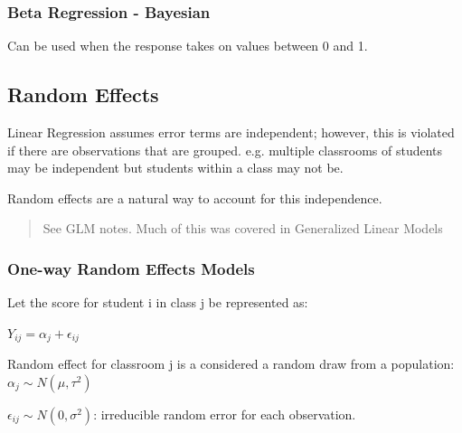 \documentclass[11pt]{article}
\begin{document}
\subsubsection{Beta Regression - Bayesian}
\label{sec:orgc52d520}

Can be used when the response takes on values between 0 and 1.


\subsection{Random Effects}
\label{sec:orga0ca169}

Linear Regression assumes error terms are independent; however, this is violated
if there are observations that are grouped. e.g. multiple classrooms of students
may be independent but students within a class may not be.

Random effects are a natural way to account for this independence.

\begin{quote}
See GLM notes. Much of this was covered in Generalized Linear Models
\end{quote}


\subsubsection{One-way Random Effects Models}
\label{sec:org9057796}

Let the score for student i in class j be represented as:

\(Y_{ij} = \alpha_j +  \epsilon_{ij}\)

Random effect for classroom j is a considered a random draw from a population: \(\alpha_j \sim N(\mu, \tau^2)\)

\(\epsilon_{ij} \sim N(0, \sigma^2)\): irreducible random error for each observation.
\end{document}

